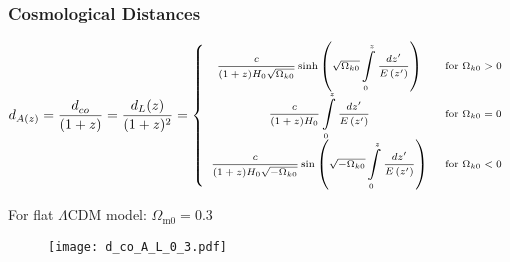 \documentclass[10pt,xcolor={dvipsnames}]{beamer}
\begin{document}
  \begin{frame}
 \frametitle{ Cosmological  Distances}
\begin{flushleft}
$ {\scriptsize d_{A(z)}=\dfrac{d_{c o}^{}}{(1+z)}=\dfrac{d_{L}(z)}{(1+z)^{2}}=\left\{\begin{array}{cl}{\dfrac{c}{(1+z) H_{0} \sqrt{\Omega_{k 0}}} \sinh \left(\sqrt{\Omega_{k 0}} \displaystyle\int\limits_{0}^{z} \frac{d z^{\prime}}{E\left(z^{\prime}\right)}\right)} & {\text { for } \Omega_{k 0}>0} \\ {\dfrac{c}{(1+z) H_{0}} \displaystyle\int\limits_{0}^{z} \dfrac{d z^{\prime}}{E\left(z^{\prime}\right)}} & {\text { for } \Omega_{k 0}=0} \\ {\dfrac{c}{(1+z) H_{0} \sqrt{-\Omega_{k 0}}} \sin \left(\sqrt{-\Omega_{k 0}} \displaystyle\int\limits_{0}^{z} \frac{d z^{\prime}}{E\left(z^{\prime}\right)}\right)} & {\text { for } \Omega_{k 0}<0}\end{array}\right.}$
\end{flushleft}
For flat $\Lambda$CDM model: $\Omega_{\mathrm{m0}}=0.3$
\begin{figure}[ht!]
\centering
\texttt{[image: d\_co\_A\_L\_0\_3.pdf]}
\end{figure} 
 \end{frame}
\end{document}
